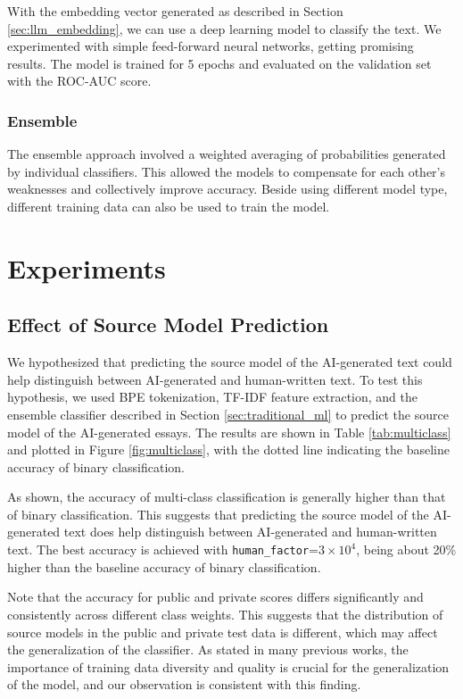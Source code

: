 \documentclass[conference]{IEEEtran}
\begin{document}
With the embedding vector generated as described in Section \ref{sec:llm_embedding}, we can use a deep learning model to classify the text. We experimented with simple feed-forward neural networks, getting promising results. The model is trained for 5 epochs and evaluated on the validation set with the ROC-AUC score.

\subsubsection{Ensemble}

The ensemble approach involved a weighted averaging of probabilities generated by individual classifiers. This allowed the models to compensate for each other's weaknesses and collectively improve accuracy. Beside using different model type, different training data can also be used to train the model.

\section{Experiments}

\subsection{Effect of Source Model Prediction}

We hypothesized that predicting the source model of the AI-generated text could help distinguish between AI-generated and human-written text. To test this hypothesis, we used BPE tokenization, TF-IDF feature extraction, and the ensemble classifier described in Section \ref{sec:traditional_ml} to predict the source model of the AI-generated essays. The results are shown in Table \ref{tab:multiclass} and plotted in Figure \ref{fig:multiclass}, with the dotted line indicating the baseline accuracy of binary classification.

As shown, the accuracy of multi-class classification is generally higher than that of binary classification. This suggests that predicting the source model of the AI-generated text does help distinguish between AI-generated and human-written text. The best accuracy is achieved with \texttt{human\_factor}=$3 \times 10^4$, being about 20\% higher than the baseline accuracy of binary classification.

Note that the accuracy for public and private scores differs significantly and consistently across different class weights. This suggests that the distribution of source models in the public and private test data is different, which may affect the generalization of the classifier. As stated in many previous works, the importance of training data diversity and quality is crucial for the generalization of the model, and our observation is consistent with this finding.
\end{document}
